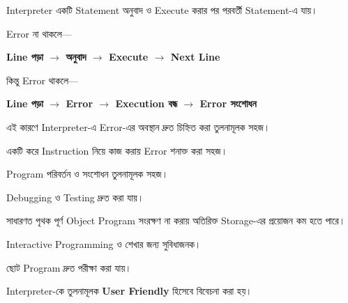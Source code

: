 
Interpreter একটি Statement অনুবাদ ও Execute করার পর পরবর্তী
Statement-এ যায়।

Error না থাকলে—

\begin{center}

\textbf{
Line পড়া
\(\longrightarrow\)
অনুবাদ
\(\longrightarrow\)
Execute
\(\longrightarrow\)
Next Line
}

\end{center}

কিন্তু Error থাকলে—

\begin{center}

\textbf{
Line পড়া
\(\longrightarrow\)
Error
\(\longrightarrow\)
Execution বন্ধ
\(\longrightarrow\)
Error সংশোধন
}

\end{center}

এই কারণে Interpreter-এ Error-এর অবস্থান দ্রুত চিহ্নিত করা
তুলনামূলক সহজ।


\begin{compacttwocolpoints}

\item একটি করে Instruction নিয়ে কাজ করায় Error শনাক্ত করা সহজ।

\item Program পরিবর্তন ও সংশোধন তুলনামূলক সহজ।

\item Debugging ও Testing দ্রুত করা যায়।

\item সাধারণত পৃথক পূর্ণ Object Program সংরক্ষণ না করায়
অতিরিক্ত Storage-এর প্রয়োজন কম হতে পারে।

\item Interactive Programming ও শেখার জন্য সুবিধাজনক।

\item ছোট Program দ্রুত পরীক্ষা করা যায়।

\item Interpreter-কে তুলনামূলক
\textbf{User Friendly} হিসেবে বিবেচনা করা হয়।

\end{compacttwocolpoints}

